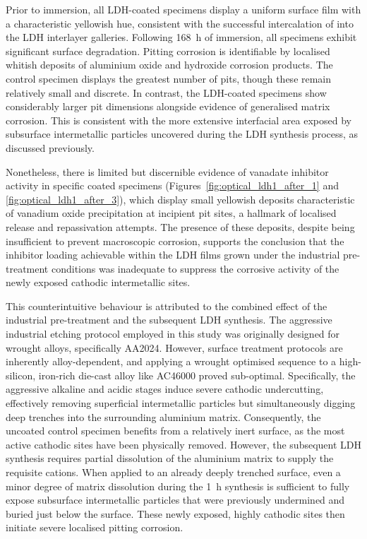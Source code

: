 \documentclass[11pt,twoside,a4paper,final]{report}
\begin{document}
Prior to immersion, all LDH-coated specimens display a uniform surface film with a characteristic yellowish hue, consistent with the successful intercalation of  into the LDH interlayer galleries. Following \qty{168}{\hour} of immersion, all specimens exhibit significant surface degradation. Pitting corrosion is identifiable by localised whitish deposits of aluminium oxide and hydroxide corrosion products. The control specimen displays the greatest number of pits, though these remain relatively small and discrete. In contrast, the LDH-coated specimens show considerably larger pit dimensions alongside evidence of generalised matrix corrosion. This is consistent with the more extensive interfacial area exposed by subsurface intermetallic particles uncovered during the LDH synthesis process, as discussed previously. 

Nonetheless, there is limited but discernible evidence of vanadate inhibitor activity in specific coated specimens (Figures~\ref{fig:optical_ldh1_after_1} and \ref{fig:optical_ldh1_after_3}), which display small yellowish deposits characteristic of vanadium oxide precipitation at incipient pit sites, a hallmark of localised  release and repassivation attempts. The presence of these deposits, despite being insufficient to prevent macroscopic corrosion, supports the conclusion that the inhibitor loading achievable within the LDH films grown under the industrial pre-treatment conditions was inadequate to suppress the corrosive activity of the newly exposed cathodic intermetallic sites.

This counterintuitive behaviour is attributed to the combined effect of the industrial pre-treatment and the subsequent LDH synthesis. The aggressive industrial etching protocol employed in this study was originally designed for wrought alloys, specifically AA2024. However, surface treatment protocols are inherently alloy-dependent, and applying a wrought optimised sequence to a high-silicon, iron-rich die-cast alloy like AC46000 proved sub-optimal. Specifically, the aggressive alkaline and acidic stages induce severe cathodic undercutting, effectively removing superficial intermetallic particles but simultaneously digging deep trenches into the surrounding aluminium matrix. Consequently, the uncoated control specimen benefits from a relatively inert surface, as the most active cathodic sites have been physically removed. However, the subsequent LDH synthesis requires partial dissolution of the aluminium matrix to supply the requisite  cations. When applied to an already deeply trenched surface, even a minor degree of matrix dissolution during the \qty{1}{\hour} synthesis is sufficient to fully expose subsurface intermetallic particles that were previously undermined and buried just below the surface. These newly exposed, highly cathodic sites then initiate severe localised pitting corrosion.
\end{document}

